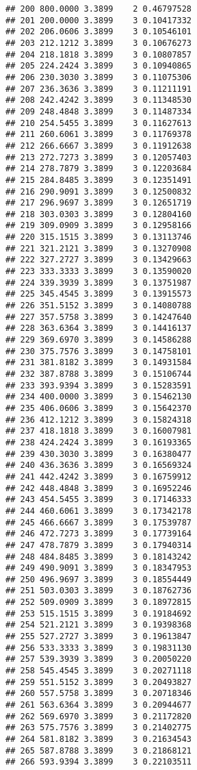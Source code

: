\documentclass[
]{article}
\begin{document}
\begin{verbatim}
## 200 800.0000 3.3899    2 0.46797528
## 201 200.0000 3.3899    3 0.10417332
## 202 206.0606 3.3899    3 0.10546101
## 203 212.1212 3.3899    3 0.10676273
## 204 218.1818 3.3899    3 0.10807857
## 205 224.2424 3.3899    3 0.10940865
## 206 230.3030 3.3899    3 0.11075306
## 207 236.3636 3.3899    3 0.11211191
## 208 242.4242 3.3899    3 0.11348530
## 209 248.4848 3.3899    3 0.11487334
## 210 254.5455 3.3899    3 0.11627613
## 211 260.6061 3.3899    3 0.11769378
## 212 266.6667 3.3899    3 0.11912638
## 213 272.7273 3.3899    3 0.12057403
## 214 278.7879 3.3899    3 0.12203684
## 215 284.8485 3.3899    3 0.12351491
## 216 290.9091 3.3899    3 0.12500832
## 217 296.9697 3.3899    3 0.12651719
## 218 303.0303 3.3899    3 0.12804160
## 219 309.0909 3.3899    3 0.12958166
## 220 315.1515 3.3899    3 0.13113746
## 221 321.2121 3.3899    3 0.13270908
## 222 327.2727 3.3899    3 0.13429663
## 223 333.3333 3.3899    3 0.13590020
## 224 339.3939 3.3899    3 0.13751987
## 225 345.4545 3.3899    3 0.13915573
## 226 351.5152 3.3899    3 0.14080788
## 227 357.5758 3.3899    3 0.14247640
## 228 363.6364 3.3899    3 0.14416137
## 229 369.6970 3.3899    3 0.14586288
## 230 375.7576 3.3899    3 0.14758101
## 231 381.8182 3.3899    3 0.14931584
## 232 387.8788 3.3899    3 0.15106744
## 233 393.9394 3.3899    3 0.15283591
## 234 400.0000 3.3899    3 0.15462130
## 235 406.0606 3.3899    3 0.15642370
## 236 412.1212 3.3899    3 0.15824318
## 237 418.1818 3.3899    3 0.16007981
## 238 424.2424 3.3899    3 0.16193365
## 239 430.3030 3.3899    3 0.16380477
## 240 436.3636 3.3899    3 0.16569324
## 241 442.4242 3.3899    3 0.16759912
## 242 448.4848 3.3899    3 0.16952246
## 243 454.5455 3.3899    3 0.17146333
## 244 460.6061 3.3899    3 0.17342178
## 245 466.6667 3.3899    3 0.17539787
## 246 472.7273 3.3899    3 0.17739164
## 247 478.7879 3.3899    3 0.17940314
## 248 484.8485 3.3899    3 0.18143242
## 249 490.9091 3.3899    3 0.18347953
## 250 496.9697 3.3899    3 0.18554449
## 251 503.0303 3.3899    3 0.18762736
## 252 509.0909 3.3899    3 0.18972815
## 253 515.1515 3.3899    3 0.19184692
## 254 521.2121 3.3899    3 0.19398368
## 255 527.2727 3.3899    3 0.19613847
## 256 533.3333 3.3899    3 0.19831130
## 257 539.3939 3.3899    3 0.20050220
## 258 545.4545 3.3899    3 0.20271118
## 259 551.5152 3.3899    3 0.20493827
## 260 557.5758 3.3899    3 0.20718346
## 261 563.6364 3.3899    3 0.20944677
## 262 569.6970 3.3899    3 0.21172820
## 263 575.7576 3.3899    3 0.21402775
## 264 581.8182 3.3899    3 0.21634543
## 265 587.8788 3.3899    3 0.21868121
## 266 593.9394 3.3899    3 0.22103511

\end{verbatim}
\end{document}
